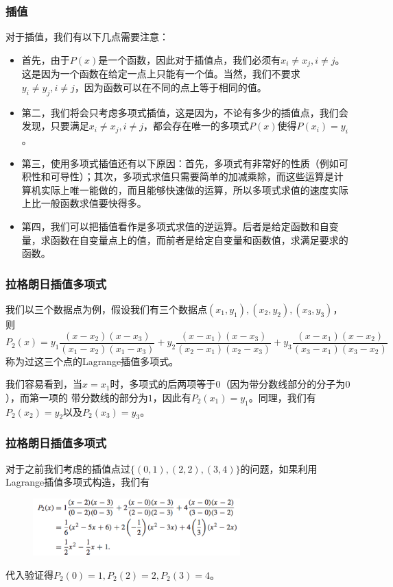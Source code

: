 \documentclass[10pt]{beamer}
\begin{document}
\begin{frame}
\frametitle{插值}
对于插值，我们有以下几点需要注意：
\begin{itemize}
\item 首先，由于$P(x)$是一个函数，因此对于插值点，我们必须有$x_i \neq x_j, i \neq j$。这是因为一个函数在给定一点上只能有一个值。当然，我们不要求$y_i \neq y_j, i \neq j$，因为函数可以在不同的点上等于相同的值。
\item 第二，我们将会只考虑多项式插值，这是因为，不论有多少的插值点，我们会发现，只要满足$x_i \neq x_j, i \neq j$，都会存在唯一的多项式$P(x)$使得$P(x_i) = y_i$。
\item 第三，使用多项式插值还有以下原因：首先，多项式有非常好的性质（例如可积性和可导性）；其次，多项式求值只需要简单的加减乘除，而这些运算是计算机实际上唯一能做的，而且能够快速做的运算，所以多项式求值的速度实际上比一般函数求值要快得多。
\item 第四，我们可以把插值看作是多项式求值的逆运算。后者是给定函数和自变量，求函数在自变量点上的值，而前者是给定自变量和函数值，求满足要求的函数。
\end{itemize}
\end{frame}


\begin{frame}
\frametitle{拉格朗日插值多项式}
我们以三个数据点为例，假设我们有三个数据点$(x_1, y_1), (x_2, y_2), (x_3, y_3)$，则
\begin{equation}
P_2(x) = y_1 \frac{(x - x_2)(x - x_3)}{(x_1 - x_2)(x_1 - x_3)} + y_2 \frac{(x - x_1)(x - x_3)}{(x_2 - x_1)(x_2 - x_3)} + y_3 \frac{(x - x_1)(x - x_2)}{(x_3 - x_1)(x_3 - x_2)} 
\end{equation}
称为过这三个点的Lagrange插值多项式。

\vspace{0.2cm}

我们容易看到，当$x = x_1$时，多项式的后两项等于$0$（因为带分数线部分的分子为$0$），而第一项的
带分数线的部分为$1$，因此有$P_2(x_1) = y_1$。同理，我们有$P_2(x_2)  = y_2$以及$P_2(x_3)  = y_3$。
\end{frame}


\begin{frame}
\frametitle{拉格朗日插值多项式}
对于之前我们考虑的插值点过$\{(0,1),(2,2),(3,4)\}$的问题，如果利用Lagrange插值多项式构造，我们有
\begin{figure}
\includegraphics[width=8cm]{figs/3_1_1_Lagrange-1} 
\end{figure}
代入验证得$P_2(0) = 1, P_2(2) = 2, P_2(3) = 4$。 
\end{frame}
\end{document}

